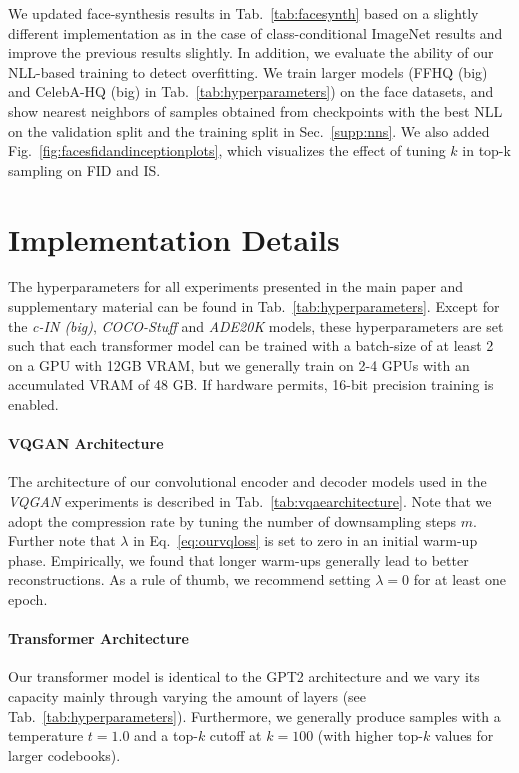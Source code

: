 \documentclass[final]{cvpr}
\begin{document}
We updated face-synthesis results in Tab.~\ref{tab:facesynth} based on a
slightly different implementation as in the case of class-conditional ImageNet
results and improve the previous results slightly. In addition, we evaluate
the ability of our NLL-based training to detect overfitting. We train larger
models (FFHQ (big) and CelebA-HQ (big) in Tab.~\ref{tab:hyperparameters}) on
the face datasets, and show nearest neighbors of samples obtained from
checkpoints with the best NLL on the validation split and the training split in
Sec.~\ref{supp:nns}. We also added Fig.~\ref{fig:facesfidandinceptionplots}, which
visualizes the effect of tuning $k$ in top-k sampling on FID and IS.


\facesfidandinceptionplots

%
%
%

\section{Implementation Details}
\label{sec:impldetails}
\noindent The hyperparameters for all experiments presented in the main paper
and supplementary material can be found in Tab.~\ref{tab:hyperparameters}.
Except for the \emph{c-IN (big)}, \emph{COCO-Stuff} and \emph{ADE20K} models, these hyperparameters are set such that
each transformer model can be trained with a batch-size of at least 2 on a GPU
with 12GB VRAM, but we generally train on 2-4 GPUs with an accumulated VRAM of
48 GB. If hardware permits, 16-bit precision training is enabled.
%
\paragraph{VQGAN Architecture} The architecture of our convolutional encoder and decoder models used in the \emph{VQGAN} experiments is described in Tab.~\ref{tab:vqaearchitecture}. Note that we adopt the compression rate by tuning the number of downsampling steps $m$.
Further note that $\lambda$ in Eq.~\ref{eq:ourvqloss} is set to zero in an initial warm-up phase. Empirically, we found that longer warm-ups generally lead to better reconstructions. As a rule of thumb, we recommend setting $\lambda = 0$ for at least one epoch.

\paragraph{Transformer Architecture}
Our transformer model is identical to the GPT2 architecture
\cite{Radford2019LanguageMA} and we vary its capacity mainly through varying the amount of layers (see Tab.~\ref{tab:hyperparameters}). 
%
%
Furthermore, we generally produce samples with a temperature $t=1.0$ and a top-$k$ cutoff at $k=100$ (with higher top-$k$ values for larger codebooks).
\vqarchitecture
\hyperparameters
\end{document}
